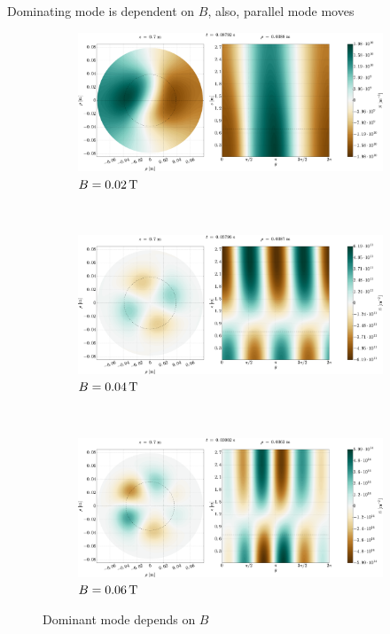 %
Dominating mode is dependent on $B$, also, parallel mode moves
%
\begin{figure}[htbp]
    \centering
    \begin{subfigure}[h]{1.00\textwidth}
        \centering
        \includegraphics[width=1.0\textwidth]{fig/results/modesDiffScanVals/B002}
        \caption{$B=0.02 \, \text{T}$}
        \label{fig:B002}
    \end{subfigure}%
    \\
    \begin{subfigure}[h]{1.00\textwidth}
        \centering
        \includegraphics[width=1.0\textwidth]{fig/results/modesDiffScanVals/B004}
        \caption{$B=0.04 \, \text{T}$}
        \label{fig:B004}
    \end{subfigure}
    \\
    \begin{subfigure}[h]{1.00\textwidth}
        \centering
        \includegraphics[width=1.0\textwidth]{fig/results/modesDiffScanVals/B006}
        \caption{$B=0.06 \, \text{T}$}
        \label{fig:B006}
    \end{subfigure}
    \caption{Dominant mode depends on $B$}
\end{figure}
